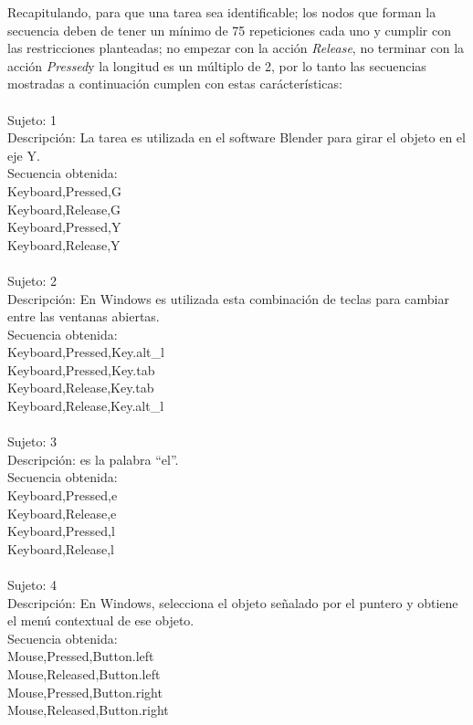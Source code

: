 Recapitulando, para que una tarea sea identificable; los nodos que forman la
 secuencia deben de tener un m\'inimo de 75 repeticiones cada uno y cumplir 
 con las restricciones planteadas; no empezar con la acci\'on \emph{Release}, 
 no terminar con la acci\'on \emph{Pressed}y la longitud es un m\'ultiplo de 
 2, por lo tanto las secuencias mostradas a continuaci\'on cumplen con estas 
 car\'acter\'isticas:
\\
\\
Sujeto: 1	\\
Descripci\'on: La tarea es utilizada en el software Blender para girar el 
 objeto en el eje Y.	\\
Secuencia obtenida:\\
Keyboard,Pressed,G\\
Keyboard,Release,G\\
Keyboard,Pressed,Y\\
Keyboard,Release,Y\\
\\
Sujeto: 2	\\
Descripci\'on: En Windows es utilizada esta combinaci\'on de teclas para 
 cambiar entre las ventanas abiertas.	\\
Secuencia obtenida:\\
Keyboard,Pressed,Key.alt\_l	\\
Keyboard,Pressed,Key.tab	\\
Keyboard,Release,Key.tab	\\
Keyboard,Release,Key.alt\_l	\\
\\
Sujeto: 3	\\
Descripci\'on: es la palabra ``el''.	\\
Secuencia obtenida:\\
Keyboard,Pressed,e	\\
Keyboard,Release,e	\\
Keyboard,Pressed,l	\\
Keyboard,Release,l	\\
\\
Sujeto: 4	\\
Descripci\'on: En Windows, selecciona el objeto se\~nalado por el puntero y
 obtiene el men\'u contextual de ese objeto.	\\
Secuencia obtenida:\\	
Mouse,Pressed,Button.left	\\
Mouse,Released,Button.left	\\
Mouse,Pressed,Button.right	\\
Mouse,Released,Button.right	\\
